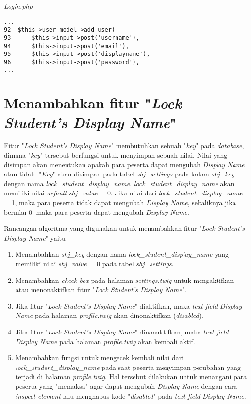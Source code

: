 \textit{Login.php}
\begin{lstlisting}[basicstyle=\ttfamily, frame=single,
columns=fullflexible, keepspaces=true, breaklines=true]
...
92	$this->user_model->add_user(
93		$this->input->post('username'),
94		$this->input->post('email'),
95		$this->input->post('displayname'),
96		$this->input->post('password'),
...
\end{lstlisting}

\section{Menambahkan fitur "\textit{Lock Student's Display Name}"}
Fitur "\textit{Lock Student's Display Name}" membutuhkan sebuah "\textit{key}" pada \textit{database}, dimana "\textit{key}" tersebut berfungsi untuk menyimpan sebuah nilai. Nilai yang disimpan akan menentukan apakah para peserta dapat mengubah \textit{Display Name} atau tidak. "\textit{Key}" akan disimpan pada tabel \textit{shj\_settings} pada kolom \textit{shj\_key} dengan nama \textit{lock\_student\_display\_name}. \textit{lock\_student\_display\_name} akan memiliki nilai \textit{default shj\_value} = 0. Jika nilai dari \textit{lock\_student\_display\_name} = 1, maka para peserta tidak dapat mengubah \textit{Display Name}, sebaliknya jika bernilai 0, maka para peserta dapat mengubah \textit{Display Name}.

Rancangan algoritma yang digunakan untuk menambahkan fitur "\textit{Lock Student's Display Name}" yaitu
\begin{enumerate}
	\item Menambahkan \textit{shj\_key} dengan nama \textit{lock\_student\_display\_name} yang memiliki nilai \textit{shj\_value} = 0 pada tabel \textit{shj\_settings}.
	\item Menambahkan \textit{check box} pada halaman \textit{settings.twig} untuk mengaktifkan atau menonaktifkan fitur "\textit{Lock Student's Display Name}".
	\item Jika fitur "\textit{Lock Student's Display Name}" diaktifkan, maka \textit{text field Display Name} pada halaman \textit{profile.twig} akan dinonaktifkan (\textit{disabled}).
	\item Jika fitur "\textit{Lock Student's Display Name}" dinonaktifkan, maka \textit{text field Display Name} pada halaman \textit{profile.twig} akan kembali aktif.
	\item Menambahkan fungsi untuk mengecek kembali nilai dari \textit{lock\_student\_display\_name} pada saat peserta menyimpan perubahan yang terjadi di halaman \textit{profile.twig}. Hal tersebut dilakukan untuk menangani para peserta yang "memaksa" agar dapat mengubah \textit{Display Name} dengan cara \textit{inspect element} lalu menghapus kode "\textit{disabled}" pada \textit{text field Display Name}.
\end{enumerate}

